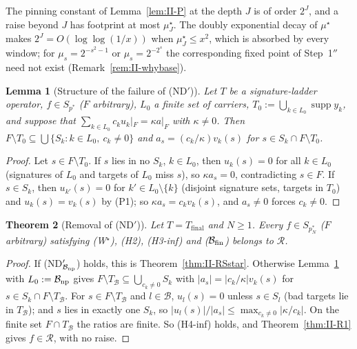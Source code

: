 \documentclass[10pt]{amsart}
\newtheorem{theorem}{Theorem}[section]
\newtheorem{lemma}[theorem]{Lemma}
\theoremstyle{definition}
\theoremstyle{remark}
\newcommand{\supp}{\operatorname{supp}}
\newcommand{\Rec}{\mathcal R}
\begin{document}
The pinning constant of Lemma~\ref{lem:II-P} at the depth $J$ is of order
$2^J$, and a raise beyond $J$ has footprint at most $\mu^\star_J$.  The
doubly exponential decay of $\mu^\star$ makes $2^{J}=O(\log\log(1/x))$ when
$\mu^\star_J\le x^2$, which is absorbed by every window; for
$\mu_s=2^{-s^2-1}$ or $\mu_s=2^{-2^s}$ the corresponding fixed point of
Step~1$''$ need not exist (Remark~\ref{rem:II-whybase}).

\begin{lemma}[Structure of the failure of (ND$'$)]\label{lem:II-ND}
Let $T$ be a signature-ladder operator, $f\in S_{p^*}$ \textup{(}$F$
arbitrary\textup{)}, $L_0$ a finite set of carriers, $T_0:=\bigcup_{k\in L_0}
\supp y_k$, and suppose that $\sum_{k\in L_0}c_ku_k|_F=\kappa a|_F$ with
$\kappa\ne0$.  Then $F\setminus T_0\subseteq\bigcup\{S_k:k\in L_0,\ c_k\ne0\}$
and $a_s=(c_k/\kappa)v_k(s)$ for $s\in S_k\cap F\setminus T_0$.
\end{lemma}

\begin{proof}
Let $s\in F\setminus T_0$.  If $s$ lies in no $S_k$, $k\in L_0$, then
$u_k(s)=0$ for all $k\in L_0$ (signatures of $L_0$ and targets of $L_0$ miss
$s$), so $\kappa a_s=0$, contradicting $s\in F$.  If $s\in S_k$, then
$u_{k'}(s)=0$ for $k'\in L_0\setminus\{k\}$ (disjoint signature sets, targets
in $T_0$) and $u_k(s)=v_k(s)$ by (P1); so $\kappa a_s=c_kv_k(s)$, and $a_s\ne0$
forces $c_k\ne0$.
\end{proof}

\begin{theorem}[Removal of (ND$'$)]\label{thm:II-NDprime}
Let $T=T_{\mathrm{final}}$ and $N\ge1$.  Every $f\in S_{p_N^*}$ \textup{(}$F$
arbitrary\textup{)} satisfying \textup{(W$^\star$)}, \textup{(H2)},
\textup{(H3-inf)} and \textup{($\mathcal B_{\rm fin}$)} belongs to $\Rec$.
\end{theorem}

\begin{proof}
If (ND$'_{\mathcal B_{\rm np}}$) holds, this is Theorem~\ref{thm:II-RSstar}.
Otherwise Lemma~\ref{lem:II-ND} with $L_0:=\mathcal B_{\rm np}$ gives
$F\setminus T_{\mathcal B}\subseteq\bigcup_{c_k\ne0}S_k$ with
$|a_s|=|c_k/\kappa|v_k(s)$ for $s\in S_k\cap F\setminus T_{\mathcal B}$.  For
$s\in F\setminus T_{\mathcal B}$ and $l\in\mathcal B$, $u_l(s)=0$ unless
$s\in S_l$ (bad targets lie in $T_{\mathcal B}$); and $s$ lies in exactly one
$S_k$, so $|u_l(s)|/|a_s|\le\max_{c_k\ne0}|\kappa/c_k|$.  On the finite set
$F\cap T_{\mathcal B}$ the ratios are finite.  So (H4-inf) holds, and
Theorem~\ref{thm:II-R1} gives $f\in\Rec$, with no raise.
\end{proof}
\end{document}
